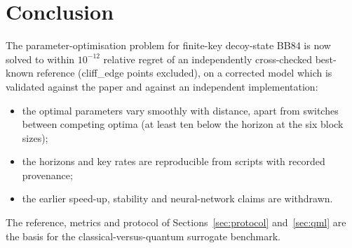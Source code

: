 \documentclass[11pt,a4paper]{article}
\begin{document}
\section{Conclusion}
The parameter-optimisation problem for finite-key decoy-state BB84 is now solved to within $10^{-12}$ relative
regret of an independently cross-checked best-known reference (cliff\_edge points excluded), on a corrected model which is validated against the paper and against an independent implementation:
\begin{itemize}
\item the optimal parameters vary smoothly with distance, apart from switches between competing optima (at least ten
  below the horizon at the six block sizes);
\item the horizons and key rates are reproducible from scripts with recorded provenance;
\item the earlier speed-up, stability and neural-network claims are withdrawn.
\end{itemize}
The reference, metrics and protocol of Sections~\ref{sec:protocol} and~\ref{sec:qml} are the basis for the
classical-versus-quantum surrogate benchmark.

\appendix
\end{document}
